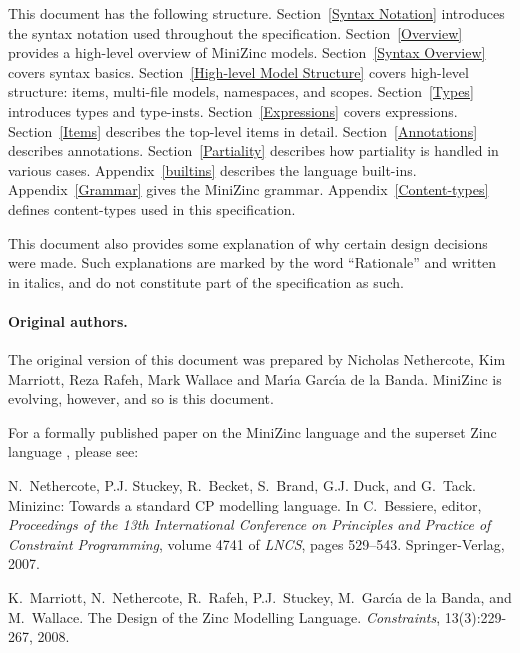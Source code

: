 \documentclass[10pt]{scrartcl}
\begin{document}
This document has the following structure.
Section~\ref{Syntax Notation} introduces the syntax notation
used throughout the specification.
Section~\ref{Overview} provides a high-level overview of MiniZinc models.
Section~\ref{Syntax Overview} covers syntax basics.
Section~\ref{High-level Model Structure} covers high-level structure: items,
multi-file models, namespaces, and scopes.
Section~\ref{Types} introduces types and type-insts.
Section~\ref{Expressions} covers expressions.
Section~\ref{Items} describes the top-level items in detail.
Section~\ref{Annotations} describes annotations.
Section~\ref{Partiality} describes how partiality is handled in various
cases.
Appendix~\ref{builtins} describes the language built-ins.
Appendix~\ref{Grammar} gives the MiniZinc grammar.
Appendix~\ref{Content-types} defines content-types used in this specification.

This document also provides some explanation of why certain design decisions
were made.  Such explanations are marked by the word ``Rationale'' and
written in italics, and do not constitute part of the specification as such.

\paragraph{Original authors.}

The original version of this document was prepared by
Nicholas Nethercote, Kim Marriott, Reza Rafeh, Mark Wallace
and Mar\'{\i}a Garc\'{\i}a de la Banda.
MiniZinc is evolving, however, and so is this document.

For a formally published paper on the MiniZinc language
and the superset Zinc language
, please see: \

N.~Nethercote, P.J. Stuckey, R.~Becket, S.~Brand, G.J. Duck, and G.~Tack.
Minizinc: Towards a standard {CP} modelling language.
In C.~Bessiere, editor, {\em Proceedings of the 13th International
  Conference on Principles and Practice of Constraint Programming}, volume 4741
  of {\em LNCS}, pages 529--543. Springer-Verlag, 2007.


K.~Marriott, N.~Nethercote, R.~Rafeh, P.J.~Stuckey,
M.~Garc\'{\i}a de la Banda, and M.~Wallace.
The Design of the Zinc Modelling Language.
\emph{Constraints}, 13(3):229-267, 2008.
\end{document}

